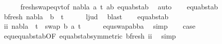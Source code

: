 \begin{isabellebody}
\ \ \ \ \isamarkupfalse%
\ fresh{\isacharunderscore}{\kern0pt}swap{\isacharunderscore}{\kern0pt}eqvt{\isacharbrackleft}{\kern0pt}of\ nabla\ a\ t{}{\isacharprime}{\kern0pt}\ {\isachardoublequoteopen}{\isacharbrackleft}{\kern0pt}{\isacharparenleft}{\kern0pt}a{\isacharcomma}{\kern0pt}b{\isacharparenright}{\kern0pt}{\isacharbrackright}{\kern0pt}{\isachardoublequoteclose}{\isacharbrackright}{\kern0pt}\ equ{\isacharunderscore}{\kern0pt}abst{\isacharunderscore}{\kern0pt}ab{\isacharparenleft}{\kern0pt}{}{\isacharparenright}{\kern0pt}\ \isamarkupfalse%
\ auto\isanewline
\ \ \isamarkupfalse%
\ equ{\isacharunderscore}{\kern0pt}abst{\isacharunderscore}{\kern0pt}ab{\isacharparenleft}{\kern0pt}{}{\isacharparenright}{\kern0pt}\ \isanewline
\ \ \isamarkupfalse%
\ b{\isacharunderscore}{\kern0pt}fresh{\isacharcolon}{\kern0pt}\ {\isachardoublequoteopen}nabla\ {\isasymturnstile}\ b\ {\isasymsharp}\ t{}{\isacharprime}{\kern0pt}{\isachardoublequoteclose}\isanewline
\ \ \ \ \isamarkupfalse%
\ l{}{\isacharunderscore}{\kern0pt}jud\ \isamarkupfalse%
\ blast\isanewline
\ \ \isamarkupfalse%
\ equ{\isacharunderscore}{\kern0pt}abst{\isacharunderscore}{\kern0pt}ab{\isacharparenleft}{\kern0pt}{}{\isacharparenright}{\kern0pt}\ \isanewline
\ \ \isamarkupfalse%
\ ii{\isacharcolon}{\kern0pt}\ {\isachardoublequoteopen}nabla\ {\isasymturnstile}\ t{}{\isacharprime}{\kern0pt}\ {\isasymapprox}\ swap\ {\isacharbrackleft}{\kern0pt}{\isacharparenleft}{\kern0pt}b{\isacharcomma}{\kern0pt}\ a{\isacharparenright}{\kern0pt}{\isacharbrackright}{\kern0pt}\ t{}{\isacharprime}{\kern0pt}{\isachardoublequoteclose}\isanewline
\ \ \ \ \isamarkupfalse%
\ equ{\isacharunderscore}{\kern0pt}swap{\isacharunderscore}{\kern0pt}abba\ \isamarkupfalse%
\ simp\isanewline
\ \ \isamarkupfalse%
\ {\isacharquery}{\kern0pt}case\ \isanewline
\ \ \ \ \isamarkupfalse%
\ equ{\isachardot}{\kern0pt}equ{\isacharunderscore}{\kern0pt}abst{\isacharunderscore}{\kern0pt}ab{\isacharbrackleft}{\kern0pt}OF\ equ{\isacharunderscore}{\kern0pt}abst{\isacharunderscore}{\kern0pt}ab{\isacharparenleft}{\kern0pt}{}{\isacharparenright}{\kern0pt}{\isacharbrackleft}{\kern0pt}symmetric{\isacharbrackright}{\kern0pt}\ b{\isacharunderscore}{\kern0pt}fresh\ ii{\isacharbrackright}{\kern0pt}\ \isamarkupfalse%
\ simp\isanewline
{}\isamarkupfalse%

\end{isabellebody}
